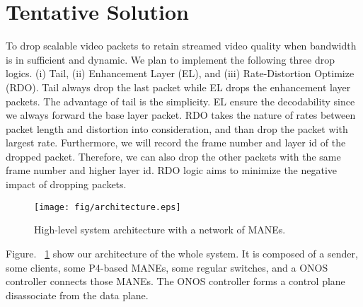 \section{Tentative Solution} \label{sec:Tentive Soution}

To drop scalable video packets to retain streamed video quality when bandwidth is in sufficient and dynamic. We plan to implement the following three drop logics. (i) Tail, (ii) Enhancement Layer (EL), and (iii) Rate-Distortion Optimize (RDO). Tail always drop the last packet while EL drops the enhancement layer packets.  The advantage of tail is the simplicity. EL ensure the decodability since we always forward the base layer packet. RDO takes the nature of rates between packet length and distortion into consideration, and than drop the packet with largest rate. Furthermore, we will record the frame number and layer id of the dropped packet. Therefore, we can also drop the other packets with the same frame number and higher layer id. RDO logic aims to minimize the negative impact of dropping packets. 

\begin{figure}[tbh]
    \centering
    \texttt{[image: fig/architecture.eps]}
    \caption{High-level system architecture with a network of MANEs.}
\vspace{-0.1cm}
    \label{architecture} 
\end{figure}

Figure. ~\ref{architecture} show our architecture of the whole system. It is composed of a sender, some clients, some P4-based MANEs, some regular switches, and a ONOS controller connects those MANEs. The ONOS controller forms a control plane disassociate from the data plane. 